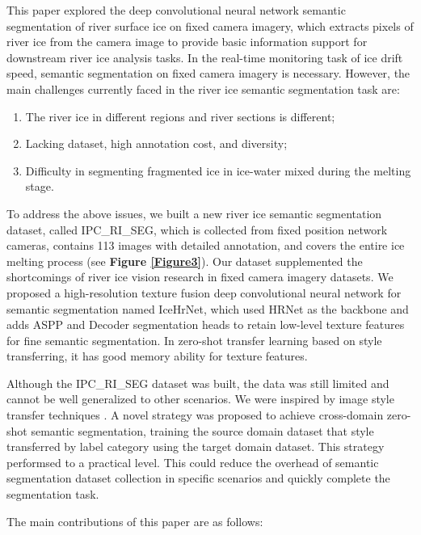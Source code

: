 \documentclass[a4paper,fleqn]{cas-dc}
\begin{document}
This paper explored the deep convolutional neural network semantic segmentation of river surface ice on fixed camera imagery, which extracts pixels of river ice from the camera image to provide basic information support for downstream river ice analysis tasks. In the real-time monitoring task of ice drift speed, semantic segmentation on fixed camera imagery is necessary. However, the main challenges currently faced in the river ice semantic segmentation task are:
\begin{enumerate}
	\item The river ice in different regions and river sections is different;
	\item Lacking dataset, high annotation cost, and diversity;
	\item Difficulty in segmenting fragmented ice in ice-water mixed during the melting stage.
\end{enumerate}

To address the above issues, we built a new river ice semantic segmentation dataset, called IPC\_RI\_SEG, which is collected from fixed position network cameras, contains 113 images with detailed annotation, and covers the entire ice melting process (see \textbf{Figure \ref{Figure3}}). Our dataset supplemented the shortcomings of river ice vision research in fixed camera imagery datasets. We proposed a high-resolution texture fusion deep convolutional neural network for semantic segmentation named IceHrNet, which used HRNet \cite{Sun_Xiao_Liu_Wang_2019} as the backbone and adds ASPP \cite{Chen_Zhu_Papandreou_Schroff_Adam_2018} and Decoder segmentation heads to retain low-level texture features for fine semantic segmentation. In zero-shot transfer learning based on style transferring, it has good memory ability for texture features.

Although the IPC\_RI\_SEG dataset was built, the data was still limited and cannot be well generalized to other scenarios. We were inspired by image style transfer techniques \cite{Gatys_Ecker_Bethge_2016}. A novel strategy was proposed to achieve cross-domain zero-shot semantic segmentation, training the source domain dataset that style transferred by label category using the target domain dataset. This strategy performsed to a practical level. This could reduce the overhead of semantic segmentation dataset collection in specific scenarios and quickly complete the segmentation task.

The main contributions of this paper are as follows:
\end{document}
